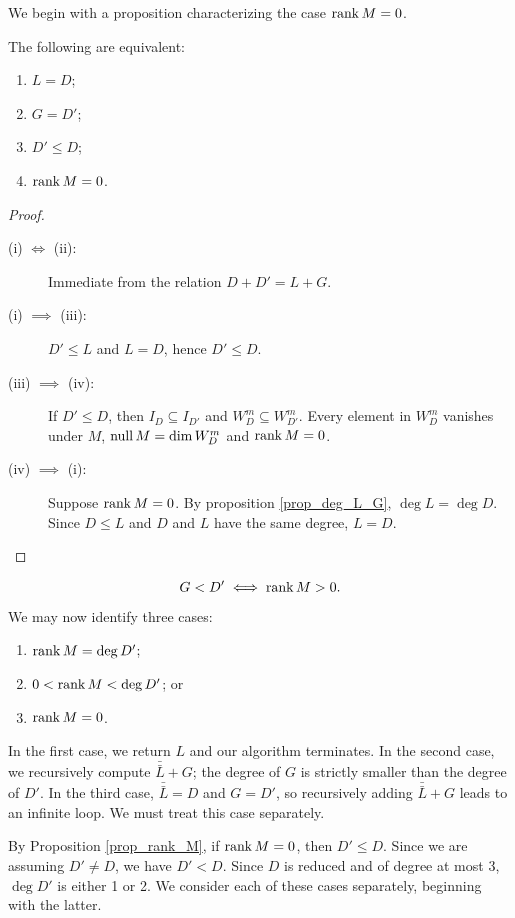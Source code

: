 We begin with a proposition characterizing the case $\operatorname{rank} M = 0$.
\begin{proposition}
  \label{prop_rank_M}
  The following are equivalent:
  \begin{enumerate}[label=(\roman*)]
    \item $L = D$;
    \item $G = D'$;
    \item $D' \leq D$;
    \item $\operatorname{rank} M = 0$.
  \end{enumerate}
\end{proposition}
\begin{proof}
  \begin{description}
    \item[(i) $\iff$ (ii):]
      Immediate from the relation $D + D' = L + G$.
    \item[(i) $\implies$ (iii):]
      $D' \leq L$ and $L = D$, hence $D' \leq D$.
    \item[(iii) $\implies$ (iv):]
      If $D' \leq D$, then $I_D \subseteq I_{D'}$ and $W_D^m \subseteq W_{D'}^m$.
      Every element in $W_D^m$ vanishes under $M$,
      $\operatorname{null} M = \dim W_D^m$ and $\operatorname{rank} M = 0$.
    \item[(iv) $\implies$ (i):]
      Suppose $\operatorname{rank} M = 0$.
      By proposition \ref{prop_deg_L_G}, $\deg L = \deg D$.
      Since $D \leq L$ and $D$ and $L$ have the same degree, $L = D$.
  \end{description}
\end{proof}
\begin{corollary}
  \[ G < D' \iff \operatorname{rank} M > 0. \]
\end{corollary}

We may now identify three cases:
\begin{enumerate}[label=(\roman*)]
  \item $\operatorname{rank} M = \deg D'$;
  \item $0 < \operatorname{rank} M < \deg D'$; or
  \item $\operatorname{rank} M = 0$.
\end{enumerate}
In the first case, we return $L$ and our algorithm terminates.
In the second case, we recursively compute $\bar{\bar L} + G$;
the degree of $G$ is strictly smaller than the degree of $D'$.
In the third case, $\bar{\bar L} = D$ and $G = D'$, so recursively adding $\bar{\bar L} + G$ leads to an infinite loop.
We must treat this case separately.

By Proposition \ref{prop_rank_M}, if $\operatorname{rank} M = 0$, then $D' \leq D$.
Since we are assuming $D' \neq D$, we have $D' < D$.
Since $D$ is reduced and of degree at most 3, $\deg D'$ is either 1 or 2.
We consider each of these cases separately, beginning with the latter.

